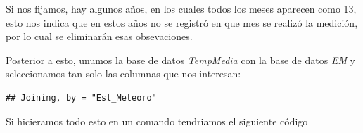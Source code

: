 \documentclass[]{book}
\newenvironment{Shaded}{\begin{snugshade}}{\end{snugshade}}
\newcommand{\DataTypeTok}[1]{\textcolor[rgb]{0.13,0.29,0.53}{#1}}
\newcommand{\DecValTok}[1]{\textcolor[rgb]{0.00,0.00,0.81}{#1}}
\newcommand{\KeywordTok}[1]{\textcolor[rgb]{0.13,0.29,0.53}{\textbf{#1}}}
\newcommand{\NormalTok}[1]{#1}
\newcommand{\OperatorTok}[1]{\textcolor[rgb]{0.81,0.36,0.00}{\textbf{#1}}}
\newcommand{\StringTok}[1]{\textcolor[rgb]{0.31,0.60,0.02}{#1}}
\begin{document}
\begin{Shaded}
\end{Shaded}

Si nos fijamos, hay algunos años, en los cuales todos los meses aparecen
como 13, esto nos indica que en estos años no se registró en que mes se
realizó la medición, por lo cual se eliminarán esas obsevaciones.

\begin{Shaded}
\end{Shaded}

Posterior a esto, unumos la base de datos \emph{TempMedia} con la base
de datos \emph{EM} y seleccionamos tan solo las columnas que nos
interesan:

\begin{verbatim}
## Joining, by = "Est_Meteoro"
\end{verbatim}

\begin{Shaded}
\end{Shaded}

Si hicieramos todo esto en un comando tendriamos el siguiente código

\begin{Shaded}
\end{Shaded}
\end{document}

